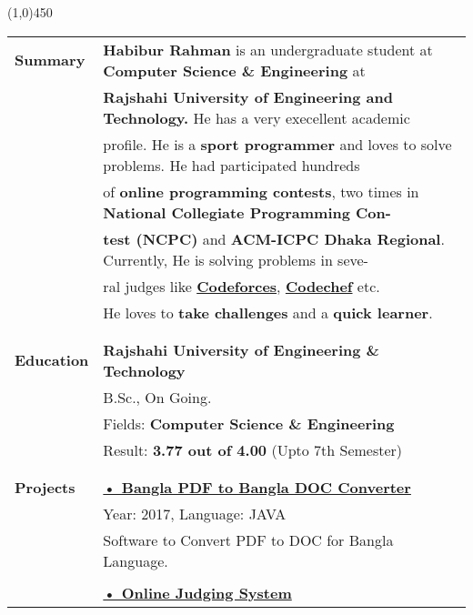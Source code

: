 \documentclass[letterpaper,11pt,oneside]{article}
\begin{document}
\vspace{-1ex}
{\line(1,0){450}}
\vspace{1ex}
\vspace{1cm}
\noindent \begin{tabular}{@{} l l}
 \Large{\textbf{Summary}}	& \textbf{Habibur Rahman } is an undergraduate student at \textbf{ Computer  Science  \& Engineering}  at\\
	& \textbf{Rajshahi University  of Engineering and  Technology. } He has a very execellent academic\\
	&  profile. He is a \textbf{sport programmer} and loves to solve problems. He had participated hundreds \\
	&  of \textbf{online programming contests}, two times in \textbf{National Collegiate Programming Con-}\\
	& \textbf{test (NCPC)} and \textbf{ACM-ICPC Dhaka Regional}. Currently, He is solving problems in seve-\\
	&  ral judges like \href{http://codeforces.com/profile/habib_rahman}{\textbf{Codeforces}}, \href{https://www.codechef.com/users/habib_ruet}{\textbf{Codechef}} etc. \\
	& He loves to \textbf{take challenges} and a \textbf{quick learner}.\\ 
 \\
 \\
 \Large{\textbf{Education}}    & \textbf{Rajshahi University of Engineering \& Technology} \\
     & B.Sc., On Going. \\
     & Fields:\textbf{ Computer Science \& Engineering} \\
     & Result: \textbf{3.77 out of 4.00} (Upto 7th Semester)\\
     \\
     \\
 \Large{\textbf{Projects}}    &  \href{https://github.com/habibrahmanbd/BanglaPDFtoBanglaDOC}{\textbf{• Bangla PDF to Bangla DOC Converter}} \\
 	& Year: 2017, Language: JAVA\\
    & \parbox{5.0in}{Software to Convert PDF to DOC for Bangla Language.}\\
    & \\
    & \href{https://github.com/habibrahmanbd/onlinelabsystem}{\textbf{• Online Judging System}}\\

\end{tabular}
\end{document}
